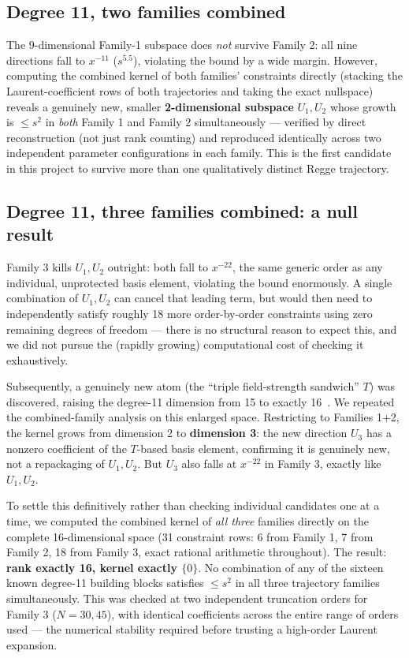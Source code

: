 \documentclass[reqno]{amsart}
\begin{document}
\subsection{Degree 11, two families combined}

The 9-dimensional Family-1 subspace does \emph{not} survive Family 2: all nine directions fall to
$x^{-11}$ ($s^{5.5}$), violating the bound by a wide margin. However, computing the combined kernel
of both families' constraints directly (stacking the Laurent-coefficient rows of both trajectories
and taking the exact nullspace) reveals a genuinely new, smaller \textbf{2-dimensional subspace}
$U_1,U_2$ whose growth is $\leq s^2$ in \emph{both} Family 1 and Family 2 simultaneously ---
verified by direct reconstruction (not just rank counting) and reproduced identically across two
independent parameter configurations in each family. This is the first candidate in this project
to survive more than one qualitatively distinct Regge trajectory.

\subsection{Degree 11, three families combined: a null result}

Family 3 kills $U_1,U_2$ outright: both fall to $x^{-22}$, the same generic order as any
individual, unprotected basis element, violating the bound enormously. A single combination of
$U_1,U_2$ can cancel that leading term, but would then need to independently satisfy roughly 18
more order-by-order constraints using zero remaining degrees of freedom --- there is no structural
reason to expect this, and we did not pursue the (rapidly growing) computational cost of checking
it exhaustively.

Subsequently, a genuinely new atom (the ``triple field-strength sandwich'' $T$) was discovered,
raising the degree-11 dimension from 15 to exactly 16~\cite{fivephotons}. We repeated the
combined-family analysis on this enlarged space. Restricting to Families 1+2, the kernel grows
from dimension 2 to \textbf{dimension 3}: the new direction $U_3$ has a nonzero coefficient of the
$T$-based basis element, confirming it is genuinely new, not a repackaging of $U_1,U_2$. But $U_3$
also falls at $x^{-22}$ in Family 3, exactly like $U_1,U_2$.

To settle this definitively rather than checking individual candidates one at a time, we computed
the combined kernel of \emph{all three} families directly on the complete 16-dimensional space (31
constraint rows: 6 from Family 1, 7 from Family 2, 18 from Family 3, exact rational arithmetic
throughout). The result: \textbf{rank exactly 16, kernel exactly $\{0\}$}. No combination of any of
the sixteen known degree-11 building blocks satisfies $\leq s^2$ in all three trajectory families
simultaneously. This was checked at two independent truncation orders for Family 3 ($N=30,45$),
with identical coefficients across the entire range of orders used --- the numerical stability
required before trusting a high-order Laurent expansion.
\end{document}
